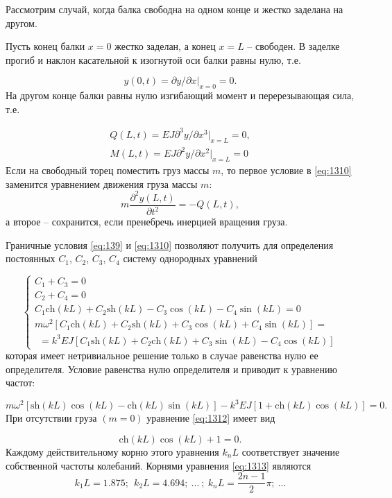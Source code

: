 \documentclass[specialist, subf, href, colorlinks=true, 14pt, final]{disser}
\theoremstyle{definition}
\newcommand{\pdfrac}[2]{\frac{\partial #1}{\partial #2}}
\begin{document}
Рассмотрим случай, когда балка свободна на одном конце и жестко заделана на другом.

Пусть конец балки $x = 0$ жестко заделан, а конец $x = L$ -- свободен. В заделке прогиб и наклон касательной к изогнутой оси балки равны нулю, т.е.
\addtocounter{equation}{1}
\begin{equation}\label{eq:139}
  y(0, t) = \partial y / \partial x |_{x = 0} = 0.
  \tag{9}
\end{equation}
На другом конце балки равны нулю изгибающий момент и перерезывающая сила, т.е.
\addtocounter{equation}{1}
\begin{equation}\label{eq:1310}
  \begin{aligned}
  Q(L, t) = EJ \partial^{3} y / \partial x^{3} |_{x=L} = 0,\\
  M(L, t) = EJ\partial^{2} y / \partial x^{2} |_{x=L} = 0
  \end{aligned}
  \tag{10}
\end{equation}
Если на свободный торец поместить груз массы $m$, то первое условие в \eqref{eq:1310} заменится уравнением движения груза массы $m$:
\[
  m\pdfrac{^{2}y(L,t)}{t^2} = -Q(L,t),
\]
а второе -- сохранится, если пренебречь инерцией вращения груза.

Граничные условия \eqref{eq:139} и \eqref{eq:1310} позволяют получить для определения постоянных $C_{1}$, $C_{2}$, $C_{3}$, $C_{4}$ систему однородных уравнений
\addtocounter{equation}{1}
\begin{equation}\label{eq:1311}
  \begin{cases}
  C_{1} + C_{3} = 0\\
  C_{2} + C_{4} = 0\\
  C_{1}\text{ch}(kL) + C_{2}\text{sh}(kL) - C_{3}\cos (kL) - C_{4}\sin (kL) = 0\\
  m\omega^{2}[C_{1}\text{ch}(kL) + C_{2}\text{sh}(kL) + C_{3}\cos (kL) + C_{4}\sin (kL)] =\\
  \ \ = k^{3}EJ[C_{1}\text{sh}(kL) + C_{2}\text{ch}(kL) + C_{3}\sin (kL) - C_{4}\cos (kL)]
  \end{cases}
  \tag{11}
\end{equation}
которая имеет нетривиальное решение только в случае равенства нулю ее определителя. Условие равенства нулю определителя и приводит к уравнению частот:
\addtocounter{equation}{1}
\begin{equation}\label{eq:1312}
  m\omega^{2}\left[\text{sh}(kL)\cos(kL) - \text{ch}(kL)\sin (kL)\right] - k^{3}EJ\left[1 + \text{ch}(kL)\cos (kL)\right] = 0.
  \tag{12}
\end{equation}
При отсутствии груза $(m=0)$ уравнение \eqref{eq:1312} имеет вид
\addtocounter{equation}{1}
\begin{equation}\label{eq:1313}
  \text{ch}(kL)\cos (kL) + 1 = 0.
  \tag{13}
\end{equation}
Каждому действительному корню этого уравнения $k_{n}L$ соответствует значение собственной частоты колебаний. Корнями уравнения \eqref{eq:1313} являются
\[
  k_{1}L = 1.875;\ \ k_{2}L = 4.694;\ ... \ ;\ k_{n}L = \frac{2n-1}{2}\pi;\ ...
\]
\end{document}
